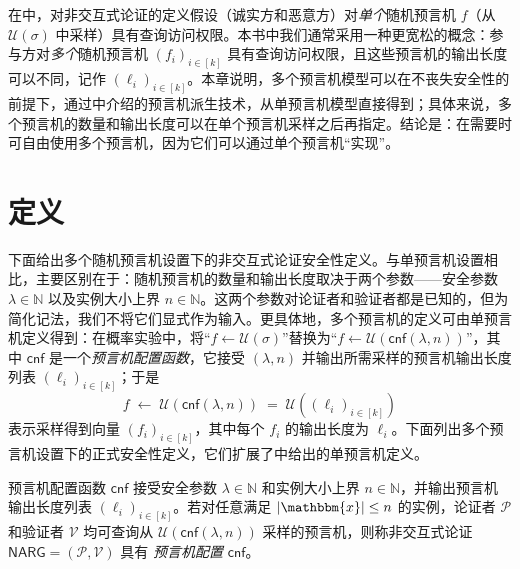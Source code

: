 \documentclass[american,singlepageview]{snargs-book-zh}
\newcommand{\SomeSize}[1]{|#1|}
\newcommand{\Naturals}{\mathbb{N}}
\newcommand{\Instance}{\mathbbm{x}}
\newcommand{\InstanceSize}{n}
\newcommand{\ProtoProver}{P}
\newcommand{\ProtoVerifier}{V}
\newcommand{\NARGSymbol}{\mathsf{NARG}}
\newcommand{\ARGFormat}[1]{\mathcal{#1}}
\newcommand{\ARGOracles}{\mathsf{cnf}}
\newcommand{\ARGProver}{\ARGFormat{\ProtoProver}}
\newcommand{\ARGVerifier}{\ARGFormat{\ProtoVerifier}}
\newcommand{\ARGSystem}{(\ARGProver,\ARGVerifier)}
\newcommand{\ROFunction}{f}
\newcommand{\RODistribution}[1]{\mathcal{U}(#1)}
\newcommand{\SecurityParameter}{\lambda}
\newcommand{\ROVectorLength}{k}
\newcommand{\ROOutputSize}{\sigma}
\newcommand{\ROChosenOutputSize}{\ell}
\begin{document}
在中，对非交互式论证的定义假设（诚实方和恶意方）对\emph{单个}随机预言机 $\ROFunction$（从 $\RODistribution{\ROOutputSize}$ 中采样）具有查询访问权限。本书中我们通常采用一种更宽松的概念：参与方对\emph{多个}随机预言机 $(\ROFunction_{i})_{i \in [\ROVectorLength]}$ 具有查询访问权限，且这些预言机的输出长度可以不同，记作 $(\ROChosenOutputSize_{i})_{i \in [\ROVectorLength]}$。本章说明，多个预言机模型可以在不丧失安全性的前提下，通过中介绍的预言机派生技术，从单预言机模型直接得到；具体来说，多个预言机的数量和输出长度可以在单个预言机采样之后再指定。结论是：在需要时可自由使用多个预言机，因为它们可以通过单个预言机“实现”。

\section{定义}
\label{section:narg-multiple-oracles-basic-definitions}

下面给出多个随机预言机设置下的非交互式论证安全性定义。与单预言机设置相比，主要区别在于：随机预言机的数量和输出长度取决于两个参数——安全参数 $\SecurityParameter\in\Naturals$ 以及实例大小上界 $\InstanceSize\in\Naturals$。这两个参数对论证者和验证者都是已知的，但为简化记法，我们不将它们显式作为输入。更具体地，多个预言机的定义可由单预言机定义得到：在概率实验中，将“$\ROFunction\gets\RODistribution{\ROOutputSize}$”替换为“$\ROFunction\gets\RODistribution{\ARGOracles(\SecurityParameter,\InstanceSize)}$”，其中 $\ARGOracles$ 是一个\emph{预言机配置函数}，它接受 $(\SecurityParameter,\InstanceSize)$ 并输出所需采样的预言机输出长度列表 $(\ROChosenOutputSize_{i})_{i\in[\ROVectorLength]}$；于是
\[
  \ROFunction\;\gets\;\RODistribution{\ARGOracles(\SecurityParameter,\InstanceSize)}
  \;=\;
  \RODistribution{(\ROChosenOutputSize_{i})_{i\in[\ROVectorLength]}}
\]
表示采样得到向量 $(\ROFunction_{i})_{i\in[\ROVectorLength]}$，其中每个 $\ROFunction_{i}$ 的输出长度为 $\ROChosenOutputSize_{i}$。下面列出多个预言机设置下的正式安全性定义，它们扩展了中给出的单预言机定义。

\begin{definition}[预言机配置]
\label{definition:narg-oracle-configuration}
预言机配置函数 $\ARGOracles$ 接受安全参数 $\SecurityParameter\in\Naturals$ 和实例大小上界 $\InstanceSize\in\Naturals$，并输出预言机输出长度列表 $(\ROChosenOutputSize_{i})_{i\in[\ROVectorLength]}$。若对任意满足 $\SomeSize{\Instance}\le\InstanceSize$ 的实例，论证者 $\ARGProver$ 和验证者 $\ARGVerifier$ 均可查询从
$\RODistribution{\ARGOracles(\SecurityParameter,\InstanceSize)}$
采样的预言机，则称非交互式论证 $\NARGSymbol=\ARGSystem$ 具有 \emph{预言机配置} $\ARGOracles$。
\end{definition}
\end{document}
